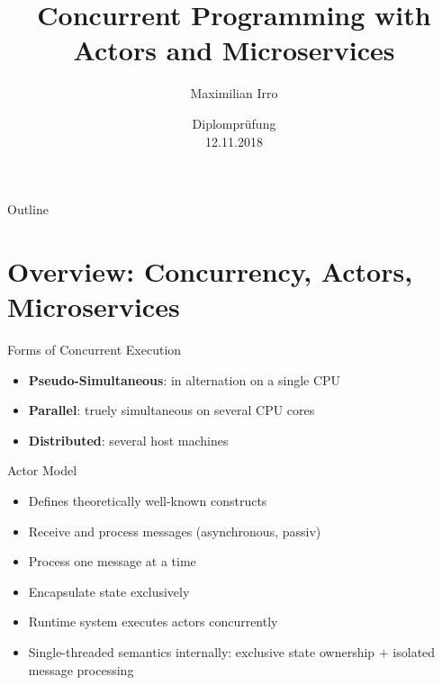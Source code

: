 \documentclass{beamer}
\title[Your Short Title]{Concurrent Programming with\\Actors and Microservices}
\author{Maximilian Irro}
\date{Diplomprüfung\\12.11.2018}
\begin{document}
\begin{frame}
  \titlepage
\end{frame}

\begin{frame}{Outline}
  \tableofcontents
\end{frame}


\section{Overview: Concurrency, Actors, Microservices}


\begin{frame}{Forms of Concurrent Execution}

\begin{itemize}
  \item \textbf{Pseudo-Simultaneous}: in alternation on a single CPU
  \item \textbf{Parallel}: truely simultaneous on several CPU cores
  \item \textbf{Distributed}: several host machines
\end{itemize}

\end{frame}


\begin{frame}{Actor Model}

\begin{itemize}
  \item Defines theoretically well-known constructs
  \item Receive and process messages (asynchronous, passiv)
  \item Process one message at a time
  \item Encapsulate state exclusively
  \item Runtime system executes actors concurrently
  \item Single-threaded semantics internally: exclusive state ownership $+$ isolated message processing
\end{itemize}

\end{frame}
\end{document}

